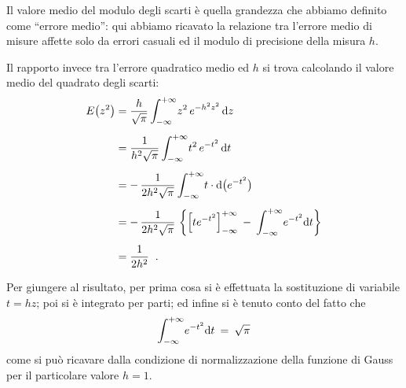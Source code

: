 Il valore medio del modulo degli scarti \`e quella grandezza
che abbiamo definito come ``errore medio'': qui abbiamo
ricavato la relazione tra l'errore medio di misure affette
solo da errori casuali ed il modulo di precisione della
misura $h$.%

Il rapporto invece tra l'errore quadratico medio ed $h$ si
trova calcolando il valore medio del quadrato degli scarti:%
\begin{align*}
  E \bigl( z^2 \bigr) &= \frac{h}{\sqrt{\pi}}
    \int_{-\infty}^{+\infty} \! z^2 \, e^{-h^2 z^2} \,
    \mathrm{d} z \\[1ex]
  &= \frac{1}{h^{2}\sqrt{\pi}}
    \int_{-\infty}^{+\infty} \! t^2 \, e^{-t^2} \, \mathrm{d}
    t \\[1ex]
  &= - \, \frac{1}{2h^2 \sqrt{\pi}}
    \int_{-\infty}^{+\infty} \! t \cdot \mathrm{d} \bigl(
    e^{-t^2} \bigr) \\[1ex]
  &= - \, \frac{1}{2h^2 \sqrt{\pi}} \, \left \{
    \left[ t e^{-t^2} \right]_{-\infty}^{+\infty} \:
    - \: \int_{-\infty}^{+\infty} \! e^{-t^2} \mathrm{d} t
    \right \} \\[1ex]
  &= \frac{1}{2h^2} \;\; .
\end{align*}

Per giungere al risultato, per prima cosa si \`e effettuata
la sostituzione di variabile $t=hz$; poi si \`e integrato
per parti; ed infine si \`e tenuto conto del fatto che
\begin{equation*}
  \int_{-\infty}^{+\infty} \! e^{-t^2} \mathrm{d} t
  \: = \: \sqrt{\pi}
\end{equation*}
come si pu\`o ricavare dalla condizione di normalizzazione
della funzione di Gauss per il particolare valore $h=1$.

